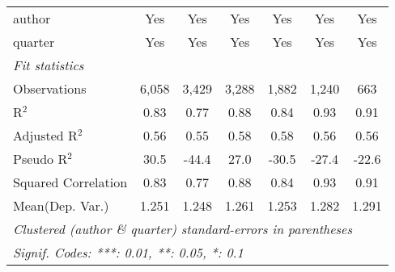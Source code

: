 \begin{tabular}{lcccccc}
   author                                                     & Yes           & Yes            & Yes           & Yes            & Yes          & Yes\\  
   quarter                                                    & Yes           & Yes            & Yes           & Yes            & Yes          & Yes\\  
   \midrule
   \emph{Fit statistics}\\
   Observations                                               & 6,058         & 3,429          & 3,288         & 1,882          & 1,240        & 663\\  
   R$^2$                                                      & 0.83          & 0.77           & 0.88          & 0.84           & 0.93         & 0.91\\  
   Adjusted R$^2$                                             & 0.56          & 0.55           & 0.58          & 0.58           & 0.56         & 0.56\\  
   Pseudo R$^2$                                               & 30.5          & -44.4          & 27.0          & -30.5          & -27.4        & -22.6\\  
   Squared Correlation                                        & 0.83          & 0.77           & 0.88          & 0.84           & 0.93         & 0.91\\  
Mean(Dep. Var.) & 1.251 & 1.248 & 1.261 & 1.253 & 1.282 & 1.291 \\
   \midrule \midrule
   \multicolumn{7}{l}{\emph{Clustered (author \& quarter) standard-errors in parentheses}}\\
   \multicolumn{7}{l}{\emph{Signif. Codes: ***: 0.01, **: 0.05, *: 0.1}}\\
\end{tabular}
\par\endgroup
